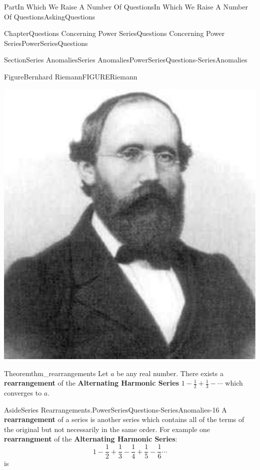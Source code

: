 \documentclass[oneside,10pt,]{book}
\newcommand{\terminology}[1]{\textbf{#1}}
\numberwithin{equation}{part}
\begin{document}
\begin{partptx}{Part}{In Which We Raise A Number Of Questions}{}{In Which We Raise A Number Of Questions}{}{}{AskingQuestions}
\begin{chapterptx}{Chapter}{Questions Concerning Power Series}{}{Questions Concerning Power Series}{}{}{PowerSeriesQuestions}
\begin{sectionptx}{Section}{Series Anomalies}{}{Series Anomalies}{}{}{PowerSeriesQuestions-SeriesAnomalies}
\begin{figureptx}{Figure}{Bernhard Riemann}{FIGURERiemann}{}
%
%
\begin{image}{0.325}{0.35}{0.325}{}%
\includegraphics[width=\linewidth]{external/images/Riemann.png}
\end{image}%
\tcblower
\end{figureptx}%
\begin{theorem}{Theorem}{}{}{thm_rearrangements}%
%
Let \(a\) be any real number.  There exists a \terminology{rearrangement} of the \terminology{Alternating Harmonic Series} \(1-\frac{1}{2}+\frac{1}{3}-\cdots\) which converges to \(a\).%
\end{theorem}
\begin{aside}{Aside}{Series Rearrangements.}{PowerSeriesQuestions-SeriesAnomalies-16}%
A \terminology{rearrangement} of a series is another series which contains all of the terms of the original but not necessarily in the same order. For example one \terminology{rearrangment} of the \terminology{Alternating Harmonic Series}:%
\begin{equation*}
1-\frac{1}{2}+\frac{1}{3}-\frac{1}{4}+\frac{1}{5}-\frac{1}{6}\cdots{}
\end{equation*}
is%
\begin{equation*}

\end{equation*}
\end{aside}
\end{sectionptx}
\end{chapterptx}
\end{partptx}
\end{document}
